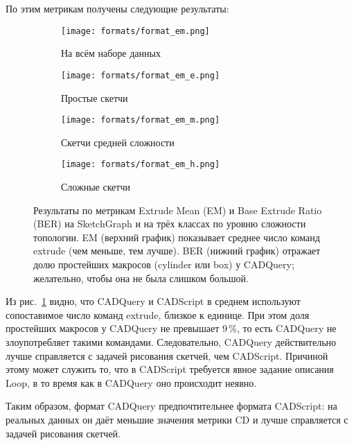 По этим метрикам получены следующие результаты:

\begin{figure}[h!]
    \centering
    \begin{subfigure}{0.45\linewidth}
        \centering
        \texttt{[image: formats/format\_em.png]}
        \caption{На всём наборе данных}
    \end{subfigure}
    \hfill
    \begin{subfigure}{0.45\linewidth}
        \centering
        \texttt{[image: formats/format\_em\_e.png]}
        \caption{Простые скетчи}
    \end{subfigure}

    \vspace{1em}

    \begin{subfigure}{0.45\linewidth}
        \centering
        \texttt{[image: formats/format\_em\_m.png]}
        \caption{Скетчи средней сложности}
    \end{subfigure}
    \hfill
    \begin{subfigure}{0.45\linewidth}
        \centering
        \texttt{[image: formats/format\_em\_h.png]}
        \caption{Сложные скетчи}
    \end{subfigure}

    \caption{Результаты по метрикам Extrude Mean (EM) и Base Extrude Ratio (BER) на SketchGraph и на трёх классах по уровню сложности топологии.
        EM (верхний график) показывает среднее число команд extrude (чем меньше, тем лучше).
        BER (нижний график) отражает долю простейших макросов (cylinder или box) у CADQuery; желательно, чтобы она не была слишком большой.}
    \label{fig:exp3}
\end{figure}

Из рис.~\ref{fig:exp3} видно, что CADQuery и CADScript в среднем используют сопоставимое число команд extrude, близкое к единице. При этом доля простейших макросов у CADQuery не превышает 9\,\%,
то есть CADQuery не злоупотребляет такими командами. Следовательно, CADQuery действительно лучше справляется с задачей рисования скетчей, чем CADScript.
Причиной этому может служить то, что в CADScript требуется явное задание описания Loop, в то время как в CADQuery оно происходит неявно.

Таким образом, формат CADQuery предпочтительнее формата CADScript: на реальных данных он даёт меньшие значения метрики CD и лучше справляется с задачей рисования скетчей.

